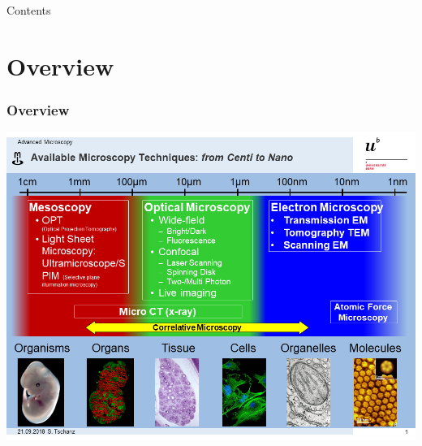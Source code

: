 \begin{frame}{Contents}
	\tableofcontents
\end{frame}

\section{Overview}
\begin{frame}
	\frametitle{Overview}
	\centering
	\includegraphics[height=\imageheight]{./images/MIC-AM_techniques}%
\end{frame}

